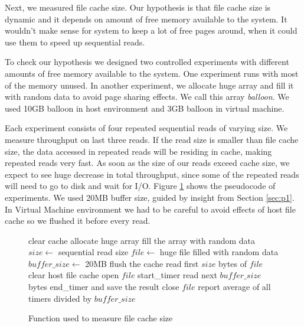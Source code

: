 Next, we measured file cache size. Our hypothesis is that file cache size is dynamic and it depends on amount of free memory available to the system. It wouldn't make sense for system to keep a lot of free pages around, when it could use them to speed up sequential reads.

To check our hypothesis we designed two controlled experiments with different amounts of free memory available to the system. One experiment runs with most of the memory unused. In another experiment, we allocate huge array and fill it with random data to avoid page sharing effects. We call this array \emph{balloon}. We used 10GB balloon in host environment and 3GB balloon in virtual machine.

Each experiment consists of four repeated sequential reads of varying size. We measure throughput on last three reads. If the read size is smaller than file cache size, the data accessed in repeated reads will be residing in cache, making repeated reads very fast. As soon as the size of our reads exceed cache size, we expect to see huge decrease in total throughput, since some of the repeated reads will need to go to disk and wait for I/O. Figure \ref{fig:p3pseudo} shows the pseudocode of experiments. We used 20MB buffer size, guided by insight from Section \ref{sec:p1}. In Virtual Machine environment we had to be careful to avoid effects of host file cache so we flushed it before every read.

\begin{figure}
\begin{algorithmic}
\STATE clear cache
\STATE allocate huge array
\STATE fill the array with random data
\ENDIF
\STATE $size \leftarrow$ {sequential read size}
\STATE $file \leftarrow$ {huge file filled with random data}
\STATE $buffer\_size \leftarrow$ 20MB
\STATE flush the cache
\STATE read first $size$ bytes of $file$
\STATE clear host file cache
\ENDIF
\STATE open $file$
\STATE start\_timer
\STATE read next $buffer\_size$ bytes
\STATE end\_timer and save the result
\ENDWHILE
\STATE close $file$
\ENDFOR
\STATE report average of all timers divided by $buffer\_size$
\end{algorithmic}
\caption{Function used to measure file cache size}
\label{fig:p3pseudo}
\end{figure}

